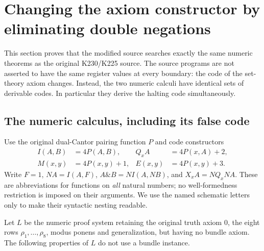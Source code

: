 \section{Changing the axiom constructor by eliminating double negations}
\label{sec:full-dn}

This section proves that the modified source searches exactly the same
numeric theorems as the original K230/K225 source.  The source programs
are not asserted to have the same register values at every boundary:
the code of the set-theory axiom changes.  Instead, the two numeric
calculi have identical sets of derivable codes.  In particular they
derive the halting code simultaneously.

\subsection{The numeric calculus, including its false code}

Use the original dual-Cantor pairing function $P$ and code constructors
\begin{align*}
 I(A,B)&=4P(A,B), & Q_xA&=4P(x,A)+2,\\
 M(x,y)&=4P(x,y)+1, & E(x,y)&=4P(x,y)+3.
\end{align*}
Write $F=1$, $N A=I(A,F)$,
$A\mathbin{\&}B=N I(A,N B)$, and
$X_x A=NQ_xN A$.  These are abbreviations for functions on
\emph{all} natural numbers; no well-formedness restriction is imposed
on their arguments.  We use the named schematic letters only to make
their syntactic nesting readable.

Let $L$ be the numeric proof system retaining the original truth axiom
$0$, the eight rows $\rho_1,\ldots,\rho_8$, modus ponens and
generalization, but having no bundle axiom.  The following properties
of $L$ do not use a bundle instance.

